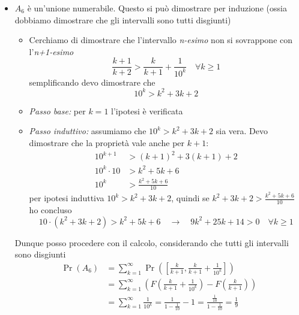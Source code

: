 \begin{center}
\begin{itemize}
\[				      \]
				\item $A_6$ è un'unione numerabile. Questo si può dimostrare per induzione (ossia dobbiamo dimostrare che gli intervalli sono tutti disgiunti)
				      \begin{itemize}
					      \item Cerchiamo di dimostrare che l'intervallo \textit{n-esimo} non si sovrappone con l'\textit{n+1-esimo}
					            \[
						            \frac{k+1}{k+2} > \frac{k}{k+1}+ \frac{1}{10^k}  \quad \forall k \ge 1
					            \]
					            semplificando devo dimostrare che
					            \[
						            10^k > k^2  + 3k + 2
					            \]
					      \item \textit{Passo base:} per $ k=1 $ l'ipotesi è verificata
					      \item \textit{Passo induttivo:} assumiamo che $ 10^k > k^2  + 3k + 2 $ sia vera. Devo dimostrare che la proprietà vale anche per $ k+1 $:
					            \begin{align*}
						            10^{k+1}       & >\left(k+1\right)^{2} + 3\left(k+1\right) + 2 \\[0.7em]
						            10^{k}\cdot 10 & > k^2  + 5k + 6                               \\[0.7em]
						            10^{k}         & > \frac{k^2  + 5k + 6}{10}
					            \end{align*}
					            per ipotesi induttiva $ 10^{k} > k^2  + 3k + 2 $, quindi se $ k^2  + 3k + 2 > \frac{k^2  + 5k + 6}{10} $ ho concluso
					            \[
						            10\cdot \left(k^2  + 3k + 2\right) > k^2  + 5k + 6 \quad \rightarrow \quad 9 k^2  + 25k + 14 > 0 \quad \forall k \ge  1
					            \]
				      \end{itemize}
				      Dunque posso procedere con il calcolo, considerando che tutti gli intervalli sono disgiunti
				      \[
					      \begin{aligned}
						      \Pr\left(A_6\right) & =\sum_{k=1}^{\infty} \Pr\left(\left[\frac{k}{k+1}, \frac{k}{k+1}+\frac{1}{10^k}\right]\right)                  \\
						                          & =\sum_{k=1}^{\infty}\left(F\left(\frac{k}{k+1}+\frac{1}{10^k}\right)-F\left(\frac{k}{k+1}\right)\right)        \\
						                          & =\sum_{k=1}^{\infty} \frac{1}{10^k}=\frac{1}{1-\frac{1}{10}}-1=\frac{\frac{1}{10}}{1-\frac{1}{10}}=\frac{1}{9}
					      \end{aligned}
				      \]
			\end{itemize}

\end{center}
